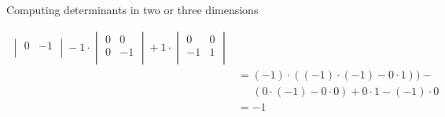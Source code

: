 \documentclass[notes=only]{beamer}
\begin{document}
\begin{frame}{Computing determinants in two or three dimensions}
{\begin{align}
\begin{vmatrix}
         0 & -1 \\
       \end{vmatrix}  
       -
       1 \cdot
       \begin{vmatrix}
        0 & 0  \\
        0 & -1 \\
       \end{vmatrix}  
      +
       1 \cdot
       \begin{vmatrix}
        0 & 0  \\
        -1 & 1  \\
       \end{vmatrix}  \\
       &= (-1) \cdot ((-1) \cdot (-1) - 0 \cdot 1)) - \\
       &\;\;\;\;\;  (0 \cdot (-1) - 0 \cdot 0) + 0 \cdot 1 -(-1) \cdot 0 \\
       &= -1
      \end{align}

    }
    \end{frame}
\end{document}
